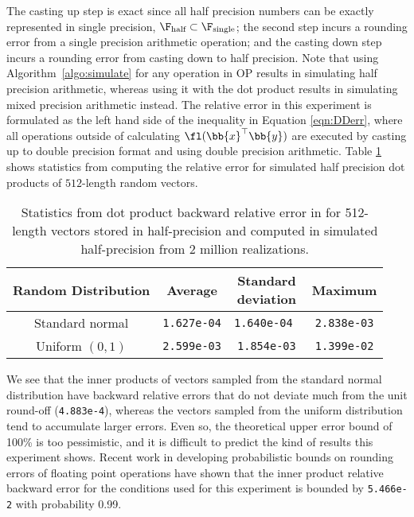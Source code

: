 The casting up step is exact since all half precision numbers can be exactly represented in single precision, $\F_{\text{half}}\subset \F_{\text{single}}$; the second step incurs a rounding error from a single precision arithmetic operation; and the casting down step incurs a rounding error from casting down to half precision.
Note that using Algorithm~\ref{algo:simulate} for any operation in OP results in simulating half precision arithmetic, whereas using it with the dot product results in simulating mixed precision arithmetic instead. 
The relative error in this experiment is formulated as the left hand side of the inequality in Equation \ref{eqn:DDerr}, where all operations outside of calculating $\fl(\bb{x}^{\top}\bb{y})$ are executed by casting up to double precision format and using double precision arithmetic.
Table \ref{table:HPdoterr} shows statistics from computing the relative error for simulated half precision dot products of $512$-length random vectors. 
\begin{table}[h]
	\centering
	\begin{tabular}{||c|c|c|c||} 
		\hline
		Random Distribution & Average & \makecell{Standard\\deviation}& Maximum\\ \hline
		Standard normal &{\tt 1.627e-04} & {\tt 1.640e-04 } & {\tt 2.838e-03}\\ \hline
		Uniform $(0,1)$ & {\tt 2.599e-03}& {\tt 1.854e-03} & {\tt 1.399e-02}\\ \hline
	\end{tabular}
	\caption{Statistics from dot product backward relative error in for 512-length vectors stored in half-precision and computed in simulated half-precision from 2 million realizations.}
	\label{table:HPdoterr}
\end{table}
We see that the inner products of vectors sampled from the standard normal distribution have backward relative errors that do not deviate much from the unit round-off ({\tt 4.883e-4}), whereas the vectors sampled from the uniform distribution tend to accumulate larger errors. 
Even so, the theoretical upper error bound of 100\% is too pessimistic, and it is difficult to predict the kind of results this experiment shows. 
Recent work in developing probabilistic bounds on rounding errors of floating point operations have shown that the inner product relative backward error for the conditions used for this experiment is bounded by {\tt 5.466e-2} with probability 0.99. \par

